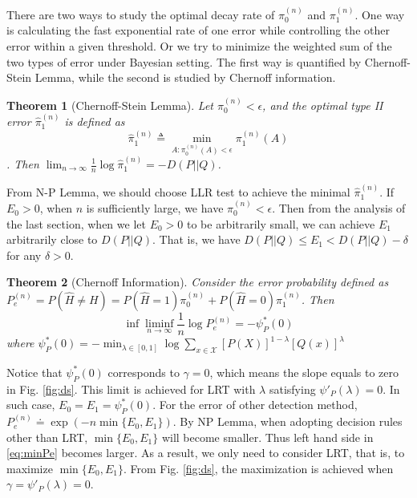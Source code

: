 \documentclass{article}
\newtheorem{theorem}{Theorem}
\begin{document}
There are two ways to study the optimal decay rate of $\pi_0^{(n)}$
and $\pi_1^{(n)}$. One way is calculating the fast exponential rate
of one error while controlling the other error within a given threshold. Or we try to minimize the weighted sum of the
two types of error
under Bayesian setting.
The first way is quantified by Chernoff-Stein Lemma, while the second is studied by Chernoff information.
\begin{theorem}[Chernoff-Stein Lemma]\label{thm:csl}
Let $\pi_0^{(n)} < \epsilon$,
and the optimal type II error $\hat{\pi}_1^{(n)}$
is defined as
$$
\hat{\pi}_1^{(n)} \triangleq \min_{A: \pi_0^{(n)}(A)<\epsilon}\pi_1^{(n)} (A)
$$.
Then $\lim_{n\to\infty} \frac{1}{n} \log \hat{\pi}_1^{(n)}
= -D(P||Q)
$.
\end{theorem}
From N-P Lemma, we should choose LLR test to achieve the 
minimal $\hat{\pi}_1^{(n)}$. If $E_0>0$, when $n$ is sufficiently
large, we have $\pi_0^{(n)} < \epsilon$.
Then from the analysis of the last
section, when we let $E_0 > 0$ to be arbitrarily small, we can
achieve $E_1$ arbitrarily close to $D(P||Q)$. That is,
we have $D(P||Q) \leq E_1 < D(P||Q) - \delta$ for any $\delta > 0$.
\begin{theorem}[Chernoff Information]
Consider the error probability defined as
$P_e^{(n)}=P(\widehat{H}\neq H)
=P(\widehat{H}=1)\pi^{(n)}_0
+P(\widehat{H}=0)\pi^{(n)}_1$. Then
\begin{equation}\label{eq:minPe}
    \inf \liminf_{n\to\infty}
    \frac{1}{n} \log P_e^{(n)}
    = - \psi_P^*(0)
\end{equation}
where $\psi_P^*(0)=-\min_{\lambda \in [0,1]}
\log \sum_{x\in \mathcal{X}}[P(X)]^{1-\lambda}[Q(x)]^{\lambda}
$
\end{theorem}
Notice that $\psi_P^*(0)$ corresponds to $\gamma=0$,
which means the slope equals to zero in Fig.
\ref{fig:ds}. This limit is achieved for LRT
with $\lambda$ satisfying $\psi'_P(\lambda)=0$.
In such case, $E_0=E_1=\psi_P^*(0)$.
For the error of other detection
method, $P_e^{(n)}\doteq \exp(-n \min\{E_0, E_1\})$.
By NP Lemma, when adopting decision rules other than
LRT, $\min\{E_0, E_1\}$ will become smaller. Thus
left hand side in \eqref{eq:minPe} becomes
larger. As a result, we only need to consider
LRT, that is, to maximize $\min\{E_0, E_1\}$.
From Fig.
\ref{fig:ds}, the maximization is achieved
when $\gamma=\psi'_P(\lambda)=0$.
\end{document}
